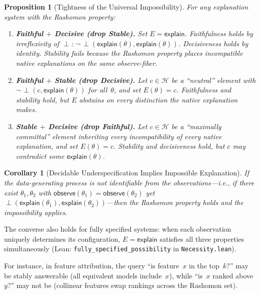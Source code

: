 \documentclass[11pt,a4paper]{article}
\newtheorem{corollary}[theorem]{Corollary}
\newtheorem{proposition}[theorem]{Proposition}
\newcommand{\sH}{\mathcal{H}}
\newcommand{\incomp}{\perp}
\begin{document}
\begin{proposition}[Tightness of the Universal Impossibility]
\label{prop:tightness}
For any explanation system with the Rashomon property:
\begin{enumerate}
  \item \textbf{Faithful $+$ Decisive (drop Stable).}
    Set $E = \mathsf{explain}$.  Faithfulness holds by irreflexivity of
    $\incomp$: $\neg\,\incomp(\mathsf{explain}(\theta), \mathsf{explain}(\theta))$.
    Decisiveness holds by identity.  Stability fails because the Rashomon
    property places incompatible native explanations on the same observe-fiber.

  \item \textbf{Faithful $+$ Stable (drop Decisive).}
    Let $c \in \sH$ be a ``neutral'' element with
    $\neg\,\incomp(c, \mathsf{explain}(\theta))$ for all~$\theta$, and set
    $E(\theta) = c$.  Faithfulness and stability hold, but $E$ abstains on
    every distinction the native explanation makes.

  \item \textbf{Stable $+$ Decisive (drop Faithful).}
    Let $c \in \sH$ be a ``maximally committal'' element inheriting every
    incompatibility of every native explanation, and set $E(\theta) = c$.
    Stability and decisiveness hold, but $c$ may contradict some
    $\mathsf{explain}(\theta)$.
\end{enumerate}
\end{proposition}

\begin{corollary}[Decidable Underspecification Implies Impossible Explanation]
\label{cor:decidable}
If the data-generating process is not identifiable from the
observations---i.e., if there exist $\theta_1, \theta_2$ with
$\mathsf{observe}(\theta_1) = \mathsf{observe}(\theta_2)$ yet
$\incomp(\mathsf{explain}(\theta_1), \mathsf{explain}(\theta_2))$---then
the Rashomon property holds and the impossibility applies.
\end{corollary}

The converse also holds for fully specified systems: when each observation
uniquely determines its configuration, $E = \mathsf{explain}$ satisfies all
three properties simultaneously (Lean: \texttt{fully\_specified\_possibility}
in \texttt{Necessity.lean}).



For instance, in feature attribution, the query ``is feature~$x$ in the top~$k$?'' may be stably answerable (all equivalent models include~$x$), while ``is~$x$ ranked above~$y$?'' may not be (collinear features swap rankings across the Rashomon set).
\end{document}
